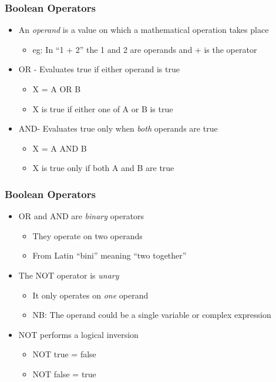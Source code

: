 \documentclass[14pt]{beamer}
\begin{document}
\begin{frame} %
\frametitle{Boolean Operators}
\begin{itemize}
\item An \textit{operand} is a value on which a mathematical operation takes place
	\begin{itemize}
		\item eg: In ``1 + 2'' the 1 and 2 are operands and + is the operator
	\end{itemize}
\item OR - Evaluates true if either operand is true
	\begin{itemize}
		\item X = A OR B
		\item X is true if either one of A or B is true
	\end{itemize}
\item AND- Evaluates true only when \textit{both} operands are true
	\begin{itemize}
		\item X = A AND B
		\item X is true only if both A and B are true
	\end{itemize}
\end{itemize}
\end{frame}

\begin{frame} %
\frametitle{Boolean Operators}
\begin{itemize}
\item OR and AND are \textit{binary} operators
	\begin{itemize}
		\item They operate on two operands
		\item From Latin ``bini'' meaning ``two together''
	\end{itemize}
\item The NOT operator is \textit{unary}
	\begin{itemize}
		\item It only operates on \textit{one} operand
		\item NB: The operand could be a single variable or complex expression
	\end{itemize}
\item NOT performs a logical inversion
	\begin{itemize}
		\item NOT true = false
		\item NOT false = true
	\end{itemize}
\end{itemize}
\end{frame}
\end{document}
